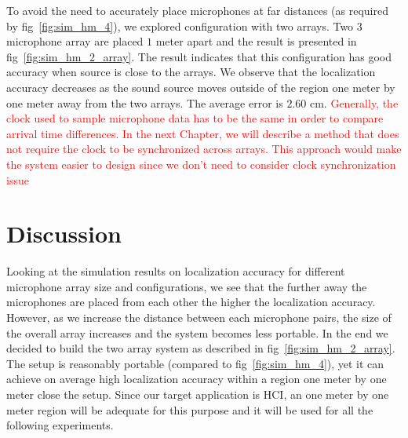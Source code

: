 To avoid the need to accurately place microphones at far distances (as required by fig~\ref{fig:sim_hm_4}), we explored configuration with two arrays. Two $3$ microphone array are placed $1$ meter apart and the result is presented in fig~\ref{fig:sim_hm_2_array}.  The result indicates that this configuration has good accuracy when source is close to the arrays. We observe that the localization accuracy decreases as the sound source moves outside of the region one meter by one meter away from the two arrays. The average error is $2.60$ cm. \textcolor{red}{Generally, the clock used to sample microphone data has to be the same in order to compare arrival time differences. In the next Chapter, we will describe a method that does not require the clock to be synchronized across arrays. This approach would make the system easier to design since we don't need to consider clock synchronization issue} 


\section{Discussion}

Looking at the simulation results on localization accuracy for different microphone array size and configurations, we see that the further away the microphones are placed from each other the higher the localization accuracy. However, as we increase the distance between each microphone pairs, the size of the overall array increases and the system becomes less portable. In the end we decided to build the two array system as described in fig~\ref{fig:sim_hm_2_array}. The setup is reasonably portable (compared to fig~\ref{fig:sim_hm_4}), yet it can achieve on average high localization accuracy within a region one meter by one meter close the setup. Since our target application is HCI, an one meter by one meter region will be adequate for this purpose and it will be used for all the following experiments.   
